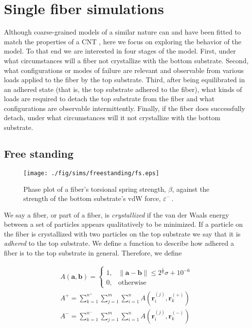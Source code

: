 \chapter{Single fiber simulations}

Although coarse-grained models of a similar nature can and have been fitted to match the properties of a CNT \cite{Cranford2010}, here we focus on exploring the behavior of the model. To that end we are interested in four stages of the model. First, under what circumstances will a fiber not crystallize with the bottom substrate. Second, what configurations or modes of failure are relevant and observable from various loads applied to the fiber by the top substrate. Third, after being equilibrated in an adhered state (that is, the top substrate adhered to the fiber), what kinds of loads are required to detach the top substrate from the fiber and what configurations are observable intermittently. Finally, if the fiber does successfully detach, under what circumstances will it not crystallize with the bottom substrate.

\section{Free standing}

	\begin{figure}
		\begin{center}
			\texttt{[image: ./fig/sims/freestanding/fs.eps]}
		\end{center}		
		\caption{Phase plot of a fiber's torsional spring strength, $\beta$, against the strength of the bottom substrate's vdW force, $\varepsilon^-$.
		\label{fig:FreeStandingGrid}}
	\end{figure}	

We say a fiber, or part of a fiber, is \textit{crystallized} if the van der Waals energy between a set of particles appears qualitatively to be minimized. If a particle on the fiber is crystallized with two particles on the top substrate we say that it is \textit{adhered} to the top substrate. We define a function to describe how adhered a fiber is to the top substrate in general. Therefore, we define


\begin{eqnarray}
	A(\textbf{a}, \textbf{b}) = \left\{ 
		\begin{array}{ll}
			1, & \|\textbf{a} - \textbf{b}\| \leq 2^{\frac{1}{6}} \sigma + 10^{-6}\\
			0, & \mbox{otherwise}
		\end{array}
		\right.  \\
	A^+ = \sum_{k=1}^{n^+} \sum_{j=1}^{m} \sum_{i=1}^{n} A(\textbf{r}_i^{(j)},\textbf{r}_k^{(+)}) \label{eqn:adhesion:top} \\ 
	A^- = \sum_{k=1}^{n^-} \sum_{j=1}^{m} \sum_{i=1}^{n} A(\textbf{r}_i^{(j)},\textbf{r}_k^{(-)}) \label{eqn:adhesion:bottom}
\end{eqnarray}


